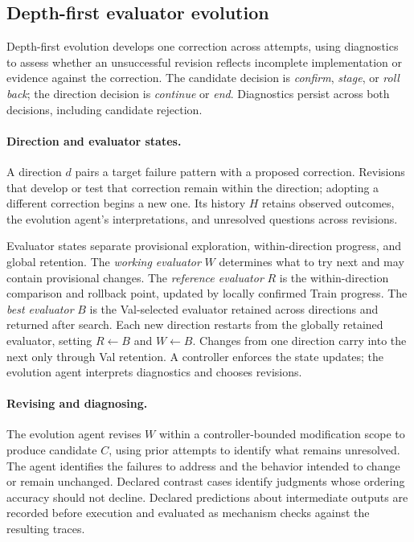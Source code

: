 \subsection{Depth-first evaluator evolution}
\label{sec:proposal}
\label{sec:search}

Depth-first evolution develops one correction across attempts, using diagnostics to assess whether an unsuccessful revision reflects incomplete implementation or evidence against the correction.
The candidate decision is \emph{confirm}, \emph{stage}, or \emph{roll back}; the direction decision is \emph{continue} or \emph{end}.
Diagnostics persist across both decisions, including candidate rejection.

\paragraph{Direction and evaluator states.}
A direction $d$ pairs a target failure pattern with a proposed correction.
Revisions that develop or test that correction remain within the direction; adopting a different correction begins a new one.
Its history $H$ retains observed outcomes, the evolution agent's interpretations, and unresolved questions across revisions.

Evaluator states separate provisional exploration, within-direction progress, and global retention.
The \emph{working evaluator} $W$ determines what to try next and may contain provisional changes.
The \emph{reference evaluator} $R$ is the within-direction comparison and rollback point, updated by locally confirmed Train progress.
The \emph{best evaluator} $B$ is the Val-selected evaluator retained across directions and returned after search.
Each new direction restarts from the globally retained evaluator, setting $R\gets B$ and $W\gets B$.
Changes from one direction carry into the next only through Val retention.
A controller enforces the state updates; the evolution agent interprets diagnostics and chooses revisions.

\paragraph{Revising and diagnosing.}
The evolution agent revises $W$ within a controller-bounded modification scope to produce candidate $C$, using prior attempts to identify what remains unresolved.
The agent identifies the failures to address and the behavior intended to change or remain unchanged.
Declared contrast cases identify judgments whose ordering accuracy should not decline.
Declared predictions about intermediate outputs are recorded before execution and evaluated as mechanism checks against the resulting traces.

